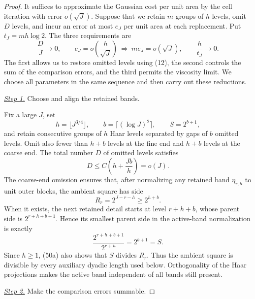 \documentclass{smfart}
\theoremstyle{definition}
\newcommand{\1}{\mathbf 1}
\begin{document}
\begin{proof}
It suffices to approximate the Gaussian cost per unit area by the cell
iteration with error $o(\sqrt J)$.  Suppose that we retain $m$ groups
of $h$ levels, omit $D$ levels, and incur an error at most $e_J$ per
unit area at each replacement.  Put $t_J=mh\log2$.  The three
requirements are
\begin{equation*}
\frac{D}{J}\longrightarrow0,\qquad
e_J=o\!\left(\frac{h}{\sqrt J}\right)
\ \Longrightarrow\
m e_J=o(\sqrt J),\qquad
\frac{h}{t_J}\longrightarrow0.
\end{equation*}
The first allows us to restore omitted levels using (12), the second
controls the sum of the comparison errors, and the third permits the
viscosity limit.  We choose all parameters in the same sequence and
then carry out these reductions.

\smallskip\noindent
\underline{\textit{Step 1.}} Choose and align the retained bands.

Fix a large $J$, set
\begin{equation*}
h=\lfloor J^{3/4}\rfloor,\qquad b=\lceil(\log J)^2\rceil,\qquad
S=2^{b+1},
\end{equation*}
and retain consecutive groups of $h$ Haar levels separated by gaps of
$b$ omitted levels.  Omit also fewer than $h+b$ levels at the fine
end and $h+b$ levels at the coarse end.  The total number $D$ of
omitted levels satisfies
\begin{equation}
D\leq C\left(h+\frac{Jb}{h}\right)=o(J).
\tag{50}
\end{equation}
The coarse-end omission ensures that, after normalizing any retained
band $\eta_ {r,h}$ to unit outer blocks, the ambient square has side
\begin{equation}
R_ r=2^{J-r-h}\geq2^{h+b}.
\tag{50a}
\end{equation}
When it exists, the next retained detail starts at level $r+h+b$, whose
parent side is $2^{r+h+b+1}$.  Hence its smallest parent side in the
active-band normalization is exactly
\begin{equation*}
\frac{2^{r+h+b+1}}{2^{r+h}}=2^{b+1}=S.
\end{equation*}
Since $h\geq1$, (50a) also shows that $S$ divides $R_r$.  Thus the
ambient square is divisible by every auxiliary dyadic length used
below.  Orthogonality of the Haar projections makes the active band
independent of all bands still present.

\smallskip\noindent
\underline{\textit{Step 2.}} Make the comparison errors summable.


\end{proof}
\end{document}
